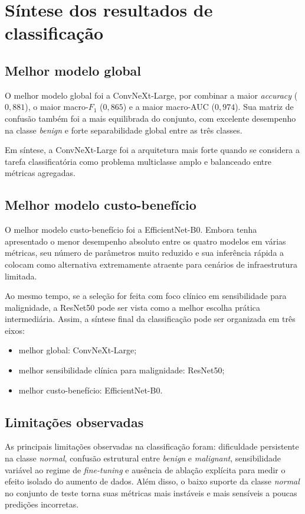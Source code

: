 \documentclass[tcc,capa]{texufpel}
\begin{document}
\section{Síntese dos resultados de classificação}

\subsection{Melhor modelo global}

O melhor modelo global foi a ConvNeXt-Large, por combinar a maior \textit{accuracy} (\(0{,}881\)), o maior macro-\(F_1\) (\(0{,}865\)) e a maior macro-AUC (\(0{,}974\)). Sua matriz de confusão também foi a mais equilibrada do conjunto, com excelente desempenho na classe \textit{benign} e forte separabilidade global entre as três classes.

Em síntese, a ConvNeXt-Large foi a arquitetura mais forte quando se considera a tarefa classificatória como problema multiclasse amplo e balanceado entre métricas agregadas.

\subsection{Melhor modelo custo-benefício}

O melhor modelo custo-benefício foi a EfficientNet-B0. Embora tenha apresentado o menor desempenho absoluto entre os quatro modelos em várias métricas, seu número de parâmetros muito reduzido e sua inferência rápida a colocam como alternativa extremamente atraente para cenários de infraestrutura limitada.

Ao mesmo tempo, se a seleção for feita com foco clínico em sensibilidade para malignidade, a ResNet50 pode ser vista como a melhor escolha prática intermediária. Assim, a síntese final da classificação pode ser organizada em três eixos:
\begin{itemize}
	\item melhor global: ConvNeXt-Large;
	\item melhor sensibilidade clínica para malignidade: ResNet50;
	\item melhor custo-benefício: EfficientNet-B0.
\end{itemize}

\subsection{Limitações observadas}

As principais limitações observadas na classificação foram: dificuldade persistente na classe \textit{normal}, confusão estrutural entre \textit{benign} e \textit{malignant}, sensibilidade variável ao regime de \textit{fine-tuning} e ausência de ablação explícita para medir o efeito isolado do aumento de dados. Além disso, o baixo suporte da classe \textit{normal} no conjunto de teste torna suas métricas mais instáveis e mais sensíveis a poucas predições incorretas.
\end{document}
